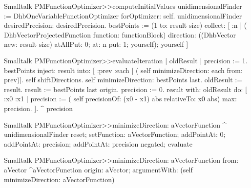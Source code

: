 \begin{displaycode}{Smalltalk}
PMFunctionOptimizer>>computeInitialValues
    unidimensionalFinder := DhbOneVariableFunctionOptimizer
                                                   forOptimizer: self.
    unidimensionalFinder desiredPrecision: desiredPrecision.
    bestPoints := (1 to: result size)
                 collect: [ :n | ( DhbVectorProjectedFunction
                                      function: functionBlock)
                                     direction: ((DhbVector
                                                     new: result size)
                                                         atAllPut: 0;
                                                         at: n put: 1;
                                                         yourself);
                                            yourself
                          ]
\end{displaycode}

\begin{displaycode}{Smalltalk}
PMFunctionOptimizer>>evaluateIteration
    | oldResult |
    precision := 1.
    bestPoints inject: result
                 into: [ :prev :each | ( self minimizeDirection: each
                                                         from: prev)].
    self shiftDirections.
    self minimizeDirection: bestPoints last.
    oldResult := result.
    result := bestPoints last origin.
    precision := 0.
    result with: oldResult do:
        [ :x0 :x1 |
          precision := ( self precisionOf: (x0 - x1) abs relativeTo:
                                               x0 abs) max: precision.
        ].
    ^ precision
\end{displaycode}

\begin{displaycode}{Smalltalk}
PMFunctionOptimizer>>minimizeDirection: aVectorFunction
    ^ unidimensionalFinder
        reset;
        setFunction: aVectorFunction;
        addPointAt: 0;
        addPointAt: precision;
        addPointAt: precision negated;
        evaluate
\end{displaycode}

\begin{displaycode}{Smalltalk}
PMFunctionOptimizer>>minimizeDirection: aVectorFunction from: aVector
    ^aVectorFunction
        origin: aVector;
        argumentWith: (self minimizeDirection: aVectorFunction)
\end{displaycode}

